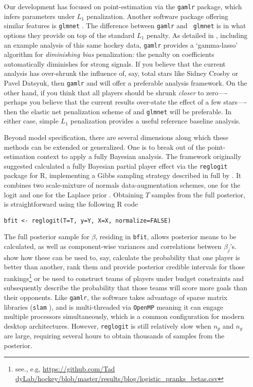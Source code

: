 Our development has focused on point-estimation via the {\tt gamlr} package,
which infers parameters under $L_1$ penalization.  Another software package
offering similar features is {\tt glmnet}
\cite{zou_regularization_2005}.  The difference between {\tt gamlr} and {\tt
glmnet} is in what options they provide on top of the standard $L_1$ penalty.
As detailed in \cite{taddy_one-step_2015}, including an example analysis of
this same hockey data, {\tt gamlr} provides a `gamma-lasso' algorithm for
\textit{diminishing bias} penalization: the penalty on coefficients
automatically diminishes for strong signals.  If you believe that the current
analysis has over-shrunk the influence of, say, total stars like Sidney Crosby
or Pavel Datsyuk, then {\tt gamlr} and \cite{taddy_one-step_2015} will offer a
preferable analysis framework.  On the other hand, if you think that all
players should be shrunk \textit{closer} to zero----perhaps you believe that
the current results over-state the effect of a few stars----then the elastic
net penalization scheme of \cite{zou_regularization_2005} and {\tt glmnet}
will be preferable.  In either case, simple $L_1$ penalization provides a
useful reference baseline analysis.

Beyond model specification, there are several dimensions along which these
methods can be extended or generalized.  One is to break out of the
point-estimation context to apply a fully Bayesian analysis. The framework
originally suggested \cite{gramacy:jensen:taddy:2013} calculated a fully
Bayesian partial player effect via the {\tt reglogit} package \cite{reglogit}
for {\sf R}, implementing a Gibbs sampling strategy
\cite{gem:gem:1984} described in full by \cite{gra:pols:2012}.  It combines
two scale-mixture of normals data-augmentation schemes, one for the logit
\cite{holmes:held:2006} and one for the Laplace prior \cite{park:casella:2008}.
Obtaining $T$ samples from the full posterior, is straightforward using the
following {\sf R} code
\begin{verbatim}
bfit <- reglogit(T=T, y=Y, X=X, normalize=FALSE)
\end{verbatim}
The full posterior sample for $\beta$, residing in {\tt bfit}, allows posterior
means to be calculated, as well as component-wise variances and correlations
between $\beta_j$'s.  \cite{gramacy:jensen:taddy:2013} show how these can be
used to, say, calculate the probability that one player is better than
another, rank them and provide posterior credible intervals for those
rankings\footnote{see., e.g, 
\url{https://github.com/Tad dyLab/hockey/blob/master/results/blog/logistic_pranks_betas.csv}
} or be used to construct teams of players under budget constraints and
subsequently describe the probability that those teams will score more goals
than their opponents.  Like {\tt gamlr}, the software takes advantage of
sparse matrix libraries ({\tt slam} \cite{slam}), and is multi-threaded via
{\tt OpenMP} meaning it can engage multiple processors simultaneously, which is a
common configuration for modern desktop architectures. However, {\tt reglogit}
is still relatively slow when $n_p$ and $n_g$ are large, requiring several
hours to obtain thousands of samples from the posterior.

